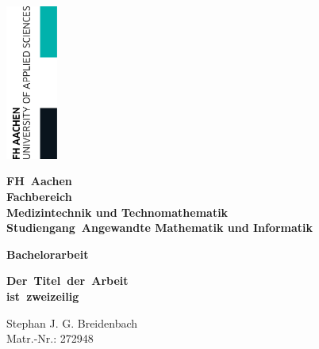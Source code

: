 \begin{titlepage}

	\thispagestyle{empty}

	\begin{flushright}
		\includegraphics[width=1.7cm]{./pic/FHAC.jpg}
	\end{flushright}

	\vspace{-2.5cm}

	\centering \bfseries \Large FH~Aachen \\
	\vspace{0.5cm}
	\normalsize Fachbereich\\
	Medizintechnik und Technomathematik \\
	Studiengang~Angewandte Mathematik und Informatik

	\vspace{1cm}

	\centering \bfseries Bachelorarbeit

	\vspace{0.8cm}

	\centering \begin{minipage}[t]{17cm}
		\centering \bfseries \large Der~Titel~der~Arbeit\\ ist~zweizeilig
		\medskip
	\end{minipage}

	\vspace{1.5cm}

	\begin{minipage}[t]{9cm}
		\centering Stephan J. G. Breidenbach \\ Matr.-Nr.: 272948
	\end{minipage}


\end{titlepage}
